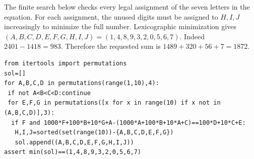 The finite search below checks every legal assignment of the seven letters in the equation. For each assignment, the unused digits must be assigned to $H,I,J$ increasingly to minimize the full number. Lexicographic minimization gives $(A,B,C,D,E,F,G,H,I,J)=(1,4,8,9,3,2,0,5,6,7)$. Indeed $2401-1418=983$. Therefore the requested sum is $1489+320+56+7=\boxed{1872}$.
\begin{verbatim}
from itertools import permutations
sol=[]
for A,B,C,D in permutations(range(1,10),4):
 if not A<B<C<D:continue
 for E,F,G in permutations([x for x in range(10) if x not in (A,B,C,D)],3):
  if F and 1000*F+100*B+10*G+A-(1000*A+100*B+10*A+C)==100*D+10*C+E:
   H,I,J=sorted(set(range(10))-{A,B,C,D,E,F,G})
   sol.append((A,B,C,D,E,F,G,H,I,J))
assert min(sol)==(1,4,8,9,3,2,0,5,6,7)
\end{verbatim}

